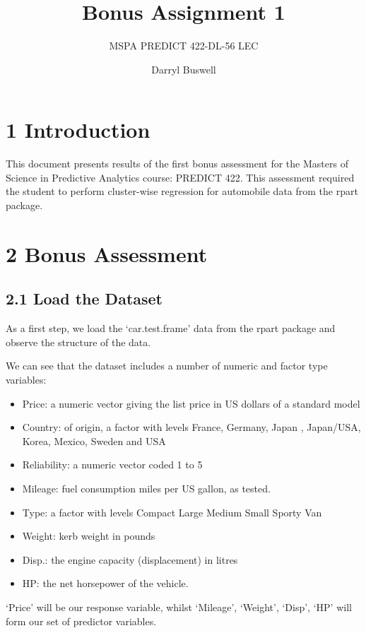 \documentclass[]{article}
\title{Bonus Assignment 1}
\subtitle{MSPA PREDICT 422-DL-56 LEC}
\author{Darryl Buswell}
\date{}
\providecommand{\tightlist}{%
  \setlength{\itemsep}{0pt}\setlength{\parskip}{0pt}}
\begin{document}
\maketitle

\section{1 Introduction}\label{introduction}

This document presents results of the first bonus assessment for the
Masters of Science in Predictive Analytics course: PREDICT 422. This
assessment required the student to perform cluster-wise regression for
automobile data from the rpart package.

\section{2 Bonus Assessment}\label{bonus-assessment}

\subsection{2.1 Load the Dataset}\label{load-the-dataset}

As a first step, we load the `car.test.frame' data from the rpart
package and observe the structure of the data.

We can see that the dataset includes a number of numeric and factor type
variables:

\begin{itemize}
\tightlist
\item
  Price: a numeric vector giving the list price in US dollars of a
  standard model
\item
  Country: of origin, a factor with levels France, Germany, Japan ,
  Japan/USA, Korea, Mexico, Sweden and USA
\item
  Reliability: a numeric vector coded 1 to 5
\item
  Mileage: fuel consumption miles per US gallon, as tested.
\item
  Type: a factor with levels Compact Large Medium Small Sporty Van
\item
  Weight: kerb weight in pounds
\item
  Disp.: the engine capacity (displacement) in litres
\item
  HP: the net horsepower of the vehicle.
\end{itemize}

`Price' will be our response variable, whilst `Mileage', `Weight',
`Disp', `HP' will form our set of predictor variables.
\end{document}
